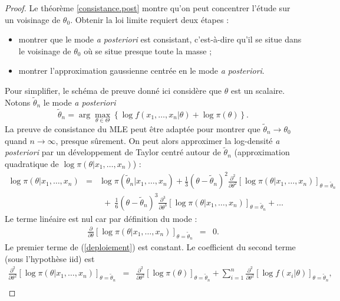 \begin{proof}%
Le théorème \ref{consistance.post} montre qu'on peut concentrer l'étude sur un voisinage de $\theta_0$. Obtenir la loi limite requiert deux étapes :
\begin{itemize}
    \item montrer que le mode {\it a posteriori} est consistant, c'est-à-dire qu'il se situe dans le voisinage de $\theta_0$ où se situe presque toute la masse ;
    \item montrer l'approximation gaussienne centrée en le mode {\it a posteriori}. 
\end{itemize}
Pour simplifier, le schéma de preuve donné ici considère que $\theta$ est un scalaire. Notons $\tilde{\theta}_n$ le mode {\it a posteriori}
$$
\tilde{\theta}_n = \arg\max\limits_{\theta\in\Theta} \left\{\log f(x_1,\ldots,x_n|\theta) + \log \pi(\theta)\right\}.
$$
La preuve de consistance du MLE peut être adaptée pour montrer que $\tilde{\theta}_n\to\theta_0$ quand $n\to\infty$, presque sûrement. On peut alors approximer la log-densité {\it a posteriori} par un développement de Taylor centré autour de $\tilde{\theta}_n$ (approximation quadratique de $\log \pi(\theta|x_1,\ldots,x_n)$) :
\begin{eqnarray}
\log \pi(\theta|x_1,\ldots,x_n) & = & \log \pi(\tilde{\theta}_n|x_1,\ldots,x_n) + \frac{1}{3}(\theta-\tilde{\theta}_n)^2 \frac{\partial^2}{\partial \theta^2}\left[\log \pi(\theta|x_1,\ldots,x_n)\right]_{\theta=\tilde{\theta}_n} \\
& & \ \ + \  \frac{1}{6} (\theta-\tilde{\theta}_n)^3 \frac{\partial^3}{\partial \theta^3}\left[\log \pi(\theta|x_1,\ldots,x_n)\right]_{\theta=\tilde{\theta}_n} + \ldots \label{deploiement}
\end{eqnarray}
Le terme linéaire est nul car par définition du mode :
\begin{eqnarray*}
\frac{\partial }{\partial \theta}\left[\log \pi(\theta|x_1,\ldots,x_n)\right]_ {\theta=\tilde{\theta}_n} & = & 0.
\end{eqnarray*}
Le premier terme de (\ref{deploiement}) est constant. Le coefficient du second terme (sous l'hypothèse iid) est 
\begin{eqnarray*}
\frac{\partial^2}{\partial \theta^2}\left[\log \pi(\theta|x_1,\ldots,x_n)\right]_{\theta=\tilde{\theta}_n} & = & \frac{\partial^2}{\partial \theta^2}\left[\log \pi(\theta)\right]_{\theta=\tilde{\theta}_n} + \sum\limits_{i=1}^n \frac{\partial^2}{\partial \theta^2} \left[\log f(x_i|\theta)\right]_{\theta=\tilde{\theta}_n}, \\

\end{eqnarray*}
\end{proof}
